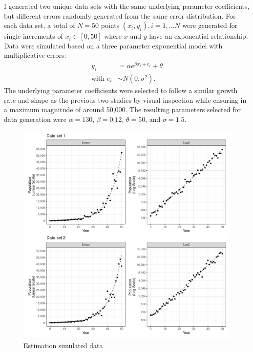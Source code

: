 \documentclass[print]{nuthesis}
\begin{document}
I generated two unique data sets with the same underlying parameter coefficients, but different errors randomly generated from the same error distribution. For each data set, a total of \(N = 50\) points \((x_i, y_i), i = 1,...N\) were generated for single increments of \(x_i\in [0, 50]\) where \(x\) and \(y\) have an exponential relationship.
Data were simulated based on a three parameter exponential model with multiplicative errors:
\begin{align}
y_i & = \alpha e^{\beta x_i + e_i} + \theta \\
\text{with } e_i & \sim N(0, \sigma^2). \nonumber
\end{align}
The underlying parameter coefficients were selected to follow a similar growth rate and shape as the previous two studies by visual inspection while ensuring in a maximum magnitude of around 50,000.
The resulting parameters selected for data generation were \(\alpha = 130\), \(\beta = 0.12\), \(\theta = 50\), and \(\sigma = 1.5\).

\begin{figure}[tbp]

{\centering \includegraphics[width=1\linewidth,]{thesis_files/figure-latex/estimation-simulated-data-1} 

}

\caption{Estimation simulated data}\label{fig:estimation-simulated-data}
\end{figure}
\end{document}
